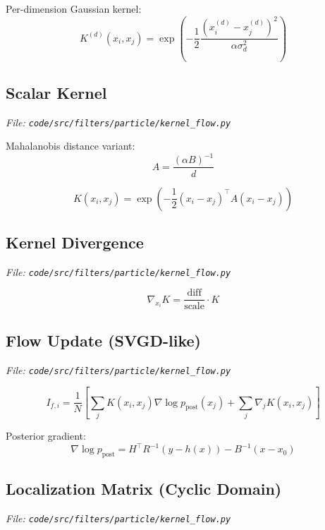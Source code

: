 \documentclass[12pt]{article}
\begin{document}
Per-dimension Gaussian kernel:
\begin{equation}
K^{(d)}(x_i, x_j) = \exp\left( -\frac{1}{2} \frac{(x_i^{(d)} - x_j^{(d)})^2}{\alpha \sigma_d^2} \right)
\end{equation}

\subsection{Scalar Kernel}
\textit{File: \texttt{code/src/filters/particle/kernel\_flow.py}}

Mahalanobis distance variant:
\begin{equation}
A = \frac{(\alpha B)^{-1}}{d}
\end{equation}

\begin{equation}
K(x_i, x_j) = \exp\left( -\frac{1}{2} (x_i - x_j)^\top A (x_i - x_j) \right)
\end{equation}

\subsection{Kernel Divergence}
\textit{File: \texttt{code/src/filters/particle/kernel\_flow.py}}

\begin{equation}
\nabla_{x_i} K = \frac{\text{diff}}{\text{scale}} \cdot K
\end{equation}

\subsection{Flow Update (SVGD-like)}
\textit{File: \texttt{code/src/filters/particle/kernel\_flow.py}}

\begin{equation}
I_{f,i} = \frac{1}{N} \left[ \sum_j K(x_i, x_j) \nabla \log p_{\text{post}}(x_j) + \sum_j \nabla_j K(x_i, x_j) \right]
\end{equation}

Posterior gradient:
\begin{equation}
\nabla \log p_{\text{post}} = H^\top R^{-1} (y - h(x)) - B^{-1}(x - x_0)
\end{equation}

\subsection{Localization Matrix (Cyclic Domain)}
\textit{File: \texttt{code/src/filters/particle/kernel\_flow.py}}
\end{document}
